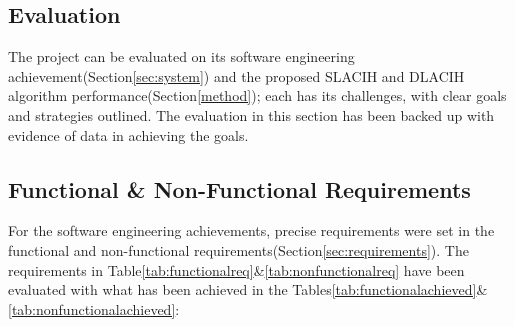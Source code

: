 \begin{center}
\section{Evaluation}
\label{sec:eval}
\end{center}

The project can be evaluated on its software engineering achievement(Section\ref{sec:system}) and the proposed SLACIH and DLACIH algorithm performance(Section\ref{method}); each has its challenges, with clear goals and strategies outlined. The evaluation in this section has been backed up with evidence of data in achieving the goals.

\subsection{Functional \& Non-Functional Requirements}

For the software engineering achievements, precise requirements were set in the functional and non-functional requirements(Section\ref{sec:requirements}). 
 The requirements in Table\ref{tab:functionalreq}\&\ref{tab:nonfunctionalreq} have been evaluated with what has been achieved in the Tables\ref{tab:functionalachieved}\&\ref{tab:nonfunctionalachieved}: 

